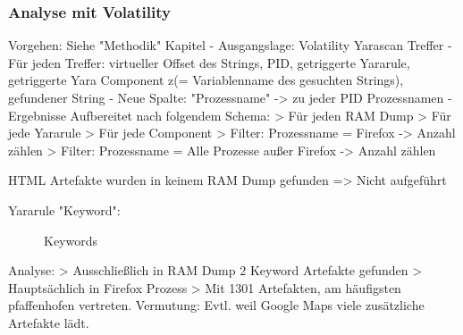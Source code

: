 \subsubsection*{Analyse mit Volatility}
Vorgehen: Siehe "Methodik" Kapitel
	- Ausgangslage: Volatility Yarascan Treffer
	- Für jeden Treffer: virtueller Offset des Strings, PID, getriggerte Yararule, getriggerte Yara Component z(= Variablenname des gesuchten Strings), gefundener String
	- Neue Spalte: "Prozessname" -> zu jeder PID Prozessnamen
	- Ergebnisse Aufbereitet nach folgendem Schema:
		> Für jeden RAM Dump
		> Für jede Yararule
		> Für jede Component
		> Filter: Prozessname = Firefox -> Anzahl zählen
		> Filter: Prozessname = Alle Prozesse außer Firefox -> Anzahl zählen

HTML Artefakte wurden in keinem RAM Dump gefunden => Nicht aufgeführt

Yararule "Keyword":
	\begin{figure}[h!]
		\centerline{}
		\label{chart:final-criteria}  
		\caption{Keywords}
	\end{figure}
	Analyse:
		> Ausschließlich in RAM Dump 2 Keyword Artefakte gefunden
		> Hauptsächlich in Firefox Prozess
		> Mit 1301 Artefakten, am häufigsten pfaffenhofen vertreten. Vermutung: Evtl. weil Google Maps viele zusätzliche Artefakte lädt. 
		

